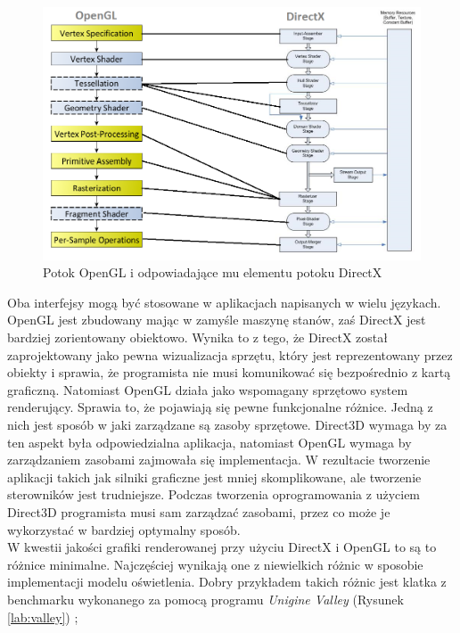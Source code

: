 \documentclass[archive]{mgr}
\begin{document}
\begin{figure}[h!]
  \centering
    \includegraphics[width=1\textwidth]{images/RenderingPipeline2.png}
   \caption{Potok OpenGL i odpowiadające mu elementu potoku DirectX}
   \label{lab:pipeline2}
\end{figure}
\newpage

Oba interfejsy mogą być stosowane w aplikacjach napisanych w wielu językach. OpenGL jest zbudowany mając w zamyśle maszynę stanów, zaś DirectX jest bardziej zorientowany obiektowo. Wynika to z tego, że DirectX został zaprojektowany jako pewna wizualizacja sprzętu, który jest reprezentowany przez obiekty i sprawia, że programista nie musi komunikować się bezpośrednio z kartą graficzną. Natomiast OpenGL działa jako wspomagany sprzętowo system renderujący. Sprawia to, że pojawiają się pewne funkcjonalne różnice. Jedną z nich jest sposób w jaki zarządzane są zasoby sprzętowe. Direct3D wymaga by za ten aspekt była odpowiedzialna aplikacja, natomiast OpenGL wymaga by zarządzaniem zasobami zajmowała się implementacja. W rezultacie tworzenie aplikacji takich jak silniki graficzne jest mniej skomplikowane, ale tworzenie sterowników jest trudniejsze. Podczas tworzenia oprogramowania z użyciem Direct3D programista musi sam zarządzać zasobami, przez co może je wykorzystać w bardziej optymalny sposób.\\

W kwestii jakości grafiki renderowanej przy użyciu DirectX i OpenGL to są to różnice minimalne. Najczęściej wynikają one z niewielkich różnic w sposobie implementacji modelu oświetlenia. Dobry przykładem takich różnic jest klatka z benchmarku wykonanego za pomocą programu \emph{Unigine Valley} (Rysunek \ref{lab:valley}) \cite{valley};
\end{document}
